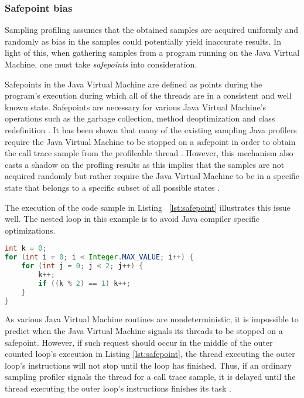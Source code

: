 \documentclass[..thesis.tex]{subfiles}
\begin{document}
\subsubsection{Safepoint bias}
Sampling profiling assumes that the obtained samples are acquired uniformly and randomly as bias in the samples could potentially yield inaccurate results. In light of this, when gathering samples from a program running on the Java Virtual Machine, one must take \textit{safepoints} into consideration.

Safepoints in the Java Virtual Machine are defined as points during the program's execution during which all of the threads are in a consistent and well known state. Safepoints are necessary for various Java Virtual Machine's operations such as the garbage collection, method deoptimization and class redefinition \cite{hotspot_glossary}. It has been shown that many of the existing sampling Java profilers require the Java Virtual Machine to be stopped on a safepoint in order to obtain the call trace sample from the profileable thread \cite{wakart_psychosomatic_2016}. However, this mechanism also casts a shadow on the profling results as this implies that the samples are not acquired randomly but rather require the Java Virtual Machine to be in a specific state that belongs to a specific subset of all possible states \cite{mytkowicz_evaluating_2010}. 

The execution of the code sample in Listing ~\ref{lst:safepoint} illustrates this issue well. The nested loop in this example is to avoid Java compiler specific optimizations.
\begin{lstlisting}[language=java,style=def,label={lst:safepoint}, caption={Counted loops do not contain safepoints}]
int k = 0;
for (int i = 0; i < Integer.MAX_VALUE; i++) {
	for (int j = 0; j < 2; j++) {
    	k++;
    	if ((k % 2) == 1) k++;
	}
}
\end{lstlisting}
As various Java Virtual Machine routines are nondeterministic, it is impossible to predict when the Java Virtual Machine signals its threads to be stopped on a safepoint. However, if such request should occur in the middle of the outer counted loop's execution in Listing \ref{lst:safepoint}, the thread executing the outer loop's instructions will not stop until the loop has finished. Thus, if an ordinary sampling profiler signals the thread for a call trace sample, it is delayed until the thread executing the outer loop's instructions finishes its task \cite{wakart_psychosomatic_2015}. 
\end{document}
